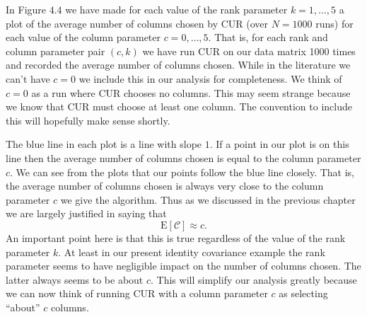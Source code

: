 \documentclass{book}
\begin{document}
In Figure $4.4$ we have made for each value of the rank parameter $k=1,\ldots,5$ a plot of the average number of columns chosen by CUR (over $N=1000$ runs) for each value of the column parameter $c=0,\ldots,5$. That is, for each rank and column parameter pair $(c,k)$ we have run CUR on our data matrix 1000 times and recorded the average number of columns chosen. While in the literature we can't have $c=0$ we include this in our analysis for completeness. We think of $c=0$ as a run where CUR chooses no columns. This may seem strange because we know that CUR must choose at least one column. The convention to include this will hopefully make sense shortly. 

The blue line in each plot is a line with slope $1$. If a point in our plot is on this line then the average number of columns chosen is equal to the column parameter $c$. We can see from the plots that our points follow the blue line closely. That is, the average number of columns chosen is always very close to the column parameter $c$ we give the algorithm. Thus as we discussed in the previous chapter we are largely justified in saying that 
$$
\text{E}\left[\mathscr{C}\right]\approx c.
$$
An important point here is that this is true regardless of the value of the rank parameter $k$. At least in our present identity covariance example the rank parameter seems to have negligible impact on the number of columns chosen. The latter always seems to be about $c$. This will simplify our analysis greatly because we can now think of running CUR with a column parameter $c$ as selecting ``about'' $c$ columns. 
\newpage
\end{document}
